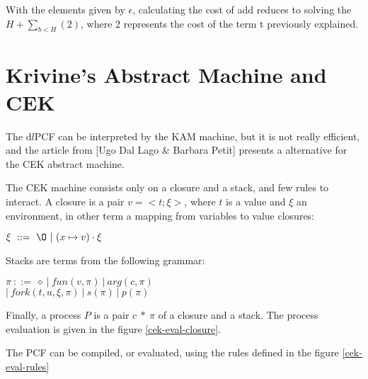 \documentclass[a4paper,12pt]{article}
\begin{document}
With the elements given by $\epsilon$, calculating the cost of add
reduces to solving the $H + \sum\limits_{b<H} (2) $, where 2
represents the cost of the term t previously explained.



\section{Krivine's Abstract Machine and CEK}

The d$l$PCF can be interpreted by the KAM machine, but it is not really
efficient, and the article from [Ugo Dal Lago \& Barbara Petit] presents a
alternative for the CEK abstract machine.

The CEK machine consists only on a closure and a stack, and few rules to
interact. A closure is a pair $v =<t;\xi>$, where $t$ is a value and $\xi$
an environment, in other term a mapping from variables to value closures:

\begin{center}
  $\xi ~ ::=~\O~|~(x \mapsto v) \cdot \xi$
\end{center}

Stacks are terms from the following grammar:

\begin{center}
  $\pi~::=~\diamond~|~fun(v, \pi)~|~arg(c, \pi)$ \\
  $|~fork(t,u,\xi,\pi)~|~s(\pi)~|~p(\pi)$
\end{center}

Finally, a process $P$ is a pair $c~*~\pi$ of a closure and a stack. The process
evaluation is given in the figure \ref{cek-eval-closure}.

The PCF can be compiled, or evaluated, using the rules defined in the figure \ref{cek-eval-rules}
\end{document}
